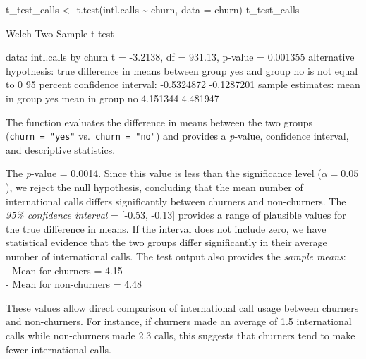 \documentclass[
  11pt,
]{book}
\makeatletter
\newenvironment{Shaded}{}{}
\newcommand{\AttributeTok}[1]{#1}
\newcommand{\ControlFlowTok}[1]{\textcolor[rgb]{0.07,0.07,0.07}{#1}}
\newcommand{\DecValTok}[1]{#1}
\newcommand{\FloatTok}[1]{#1}
\newcommand{\FunctionTok}[1]{#1}
\newcommand{\NormalTok}[1]{#1}
\newcommand{\OtherTok}[1]{\textcolor[rgb]{0.39,0.39,0.39}{#1}}
\newcommand{\SpecialCharTok}[1]{\textcolor[rgb]{0.39,0.39,0.39}{#1}}
\newenvironment{kframe}{%
\medskip{}
\setlength{\fboxsep}{.8em}
 \def\at@end@of@kframe{}%
 \ifinner\ifhmode%
  \def\at@end@of@kframe{\end{minipage}}%
  \begin{minipage}{\columnwidth}%
 \fi\fi%
 \def\FrameCommand##1{\hskip\@totalleftmargin \hskip-\fboxsep
 \colorbox{shadecolor}{##1}\hskip-\fboxsep
     \hskip-\linewidth \hskip-\@totalleftmargin \hskip\columnwidth}%
 \MakeFramed {\advance\hsize-\width
   \@totalleftmargin\z@ \linewidth\hsize
   \@setminipage}}%
 {\par\unskip\endMakeFramed%
 \at@end@of@kframe}
\renewenvironment{Shaded}{\begin{kframe}}{\end{kframe}}
\theoremstyle{definition}
\theoremstyle{definition}
\theoremstyle{definition}
\theoremstyle{definition}
\theoremstyle{remark}
\makeatother
\begin{document}
\begin{Shaded}
\begin{Highlighting}[]
\NormalTok{t\_test\_calls }\OtherTok{\textless{}{-}} \FunctionTok{t.test}\NormalTok{(intl.calls }\SpecialCharTok{\textasciitilde{}}\NormalTok{ churn, }\AttributeTok{data =}\NormalTok{ churn)}
\NormalTok{t\_test\_calls}
   
\NormalTok{    Welch Two Sample t}\SpecialCharTok{{-}}\NormalTok{test}
   
\NormalTok{   data}\SpecialCharTok{:}\NormalTok{  intl.calls by churn}
\NormalTok{   t }\OtherTok{=} \SpecialCharTok{{-}}\FloatTok{3.2138}\NormalTok{, df }\OtherTok{=} \FloatTok{931.13}\NormalTok{, p}\SpecialCharTok{{-}}\NormalTok{value }\OtherTok{=} \FloatTok{0.001355}
\NormalTok{   alternative hypothesis}\SpecialCharTok{:}\NormalTok{ true difference }\ControlFlowTok{in}\NormalTok{ means between group yes and group no is not equal to }\DecValTok{0}
   \DecValTok{95}\NormalTok{ percent confidence interval}\SpecialCharTok{:}
    \SpecialCharTok{{-}}\FloatTok{0.5324872} \SpecialCharTok{{-}}\FloatTok{0.1287201}
\NormalTok{   sample estimates}\SpecialCharTok{:}
\NormalTok{   mean }\ControlFlowTok{in}\NormalTok{ group yes  mean }\ControlFlowTok{in}\NormalTok{ group no }
            \FloatTok{4.151344}          \FloatTok{4.481947}
\end{Highlighting}
\end{Shaded}

The function evaluates the difference in means between the two groups (\texttt{churn\ =\ "yes"} vs.~\texttt{churn\ =\ "no"}) and provides a \emph{p}-value, confidence interval, and descriptive statistics.

The \emph{p}-value = 0.0014. Since this value is less than the significance level (\(\alpha = 0.05\)), we reject the null hypothesis, concluding that the mean number of international calls differs significantly between churners and non-churners. The \emph{95\% confidence interval} = {[}-0.53, -0.13{]} provides a range of plausible values for the true difference in means. If the interval does not include zero, we have statistical evidence that the two groups differ significantly in their average number of international calls. The test output also provides the \emph{sample means}:\\
- Mean for churners = 4.15\\
- Mean for non-churners = 4.48

These values allow direct comparison of international call usage between churners and non-churners. For instance, if churners made an average of 1.5 international calls while non-churners made 2.3 calls, this suggests that churners tend to make fewer international calls.
\end{document}
